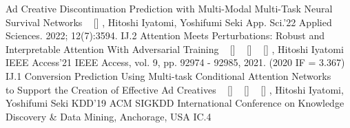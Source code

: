 
\begin{publications}
    \publication
        {Ad Creative Discontinuation Prediction with Multi-Modal Multi-Task Neural Survival Networks}
        {
            ~ [\href{https://www.mdpi.com/2076-3417/12/7/3594}{\small{\linkSymbol}}]
        }
        {\underline{}, Hitoshi Iyatomi, Yoshifumi Seki}
        {App. Sci.'22} {Applied Sciences. 2022; 12(7):3594.} {IJ.2}
    \publication
        {Attention Meets Perturbations: Robust and Interpretable Attention With Adversarial Training}
        {
            ~ [\href{https://ieeexplore.ieee.org/document/9467291}{\small{\linkSymbol}}]
            ~ [\href{https://arxiv.org/abs/2009.12064}{\small{\arxivSymbol}}]
            ~ [\href{https://github.com/shunk031/attention-meets-perturbation}{\small{\githubSymbol}}]
        }
        {\underline{}, Hitoshi Iyatomi}
        {IEEE Access'21} {IEEE Access, vol. 9, pp. 92974 - 92985, 2021. (2020 IF = 3.367)} {IJ.1}
    \publication
        {Conversion Prediction Using Multi-task Conditional Attention Networks \\ to Support the Creation of Effective Ad Creatives}
        {
            ~ [\href{https://dl.acm.org/doi/10.1145/3292500.3330789}{\small{\linkSymbol}}]
            ~ [\href{https://arxiv.org/abs/1905.07289}{\small{\arxivSymbol}}]
            ~ [\href{https://github.com/shunk031/Multi-task-Conditional-Attention-Networks}{\small{\githubSymbol}}]
        }
        {\underline{}, Hitoshi Iyatomi, Yoshifumi Seki}
        {KDD'19} {ACM SIGKDD International Conference on Knowledge Discovery \& Data Mining, Anchorage, USA} {IC.4}
\end{publications}

